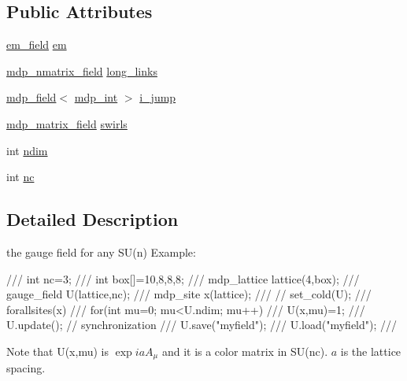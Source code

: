\subsection*{Public Attributes}
\begin{DoxyCompactItemize}
\item 
\hyperlink{classem__field}{em\_\-field} \hyperlink{classgauge__field_a8e12cc66b84dc51a33e0a942cc7c3f5c}{em}
\item 
\hyperlink{classmdp__nmatrix__field}{mdp\_\-nmatrix\_\-field} \hyperlink{classgauge__field_a2371b7cec512a57c18ba34269a5ba95a}{long\_\-links}
\item 
\hyperlink{classmdp__field}{mdp\_\-field}$<$ \hyperlink{mdp__global__vars_8h_aaa1ad9d0dcd2124aa5af0120d9954174}{mdp\_\-int} $>$ \hyperlink{classgauge__field_a3914ca4c0b33e495a2c1d34f158d6ce2}{i\_\-jump}
\item 
\hyperlink{classmdp__matrix__field}{mdp\_\-matrix\_\-field} \hyperlink{classgauge__field_a8b62d947d9237b33c554f3490cd62335}{swirls}
\item 
int \hyperlink{classgauge__field_a6be2d71c62063374567046e00cfb0983}{ndim}
\item 
int \hyperlink{classgauge__field_ada7f51e4041a64c45f484fc0a734a464}{nc}
\end{DoxyCompactItemize}


\subsection{Detailed Description}
the gauge field for any SU(n) Example: \begin{DoxyVerb}
///    int nc=3; 
///    int box[]={10,8,8,8};
///    mdp_lattice lattice(4,box);
///    gauge_field U(lattice,nc);
///    mdp_site x(lattice);
///    // set_cold(U);
///    forallsites(x)
///       for(int mu=0; mu<U.ndim; mu++)
///          U(x,mu)=1;
///    U.update(); // synchronization
///    U.save("myfield");
///    U.load("myfield");
/// \end{DoxyVerb}
 Note that U(x,mu) is $ \exp{iaA_{\mu}} $ and it is a color matrix in SU(nc). $a$ is the lattice spacing. 

